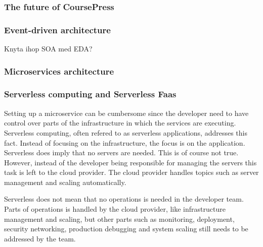 \documentclass[a4paper,12pt]{article} %
\begin{document}
\subsubsection{The future of CoursePress}

\subsubsection{Event-driven architecture}
\cite{Michelson2006}


Knyta ihop SOA med EDA?\cite{Kong2008}

\subsubsection{Microservices architecture}


\subsubsection{Serverless computing and Serverless Faas}

Setting up a microservice can be cumbersome since the developer need to have control over parts of the infrastructure in which the services are executing. Serverless computing, often refered to as serverless applications, addresses this fact. Instead of focusing on the infrastructure, the focus is on the application. Serverless does imply that no servers are needed. This is of course not true. However, instead of the developer being responsible for managing the servers this task is left to the cloud provider. The cloud provider handles topics such as server management and scaling automatically.

Serverless does not mean that no operations is needed in the developer team. Parts of operations is handled by the cloud provider, like infrastructure management and scaling, but other parts such as monitoring, deployment, security networking, production debugging and system scaling still needs to be addressed by the team. \cite{MikeRoberts2016}
\end{document}
